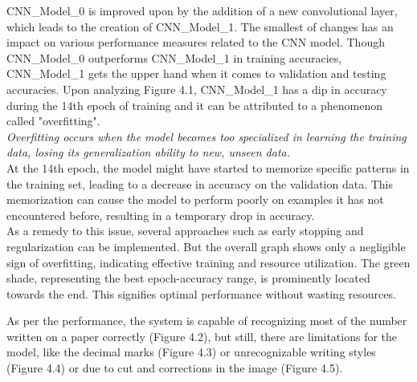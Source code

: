 \noindent CNN\_Model\_0 is improved upon by the addition of a new convolutional layer, which leads to the creation of CNN\_Model\_1. The smallest of changes has an impact on various performance measures related to the CNN model. Though CNN\_Model\_0 outperforms CNN\_Model\_1 in training accuracies, CNN\_Model\_1 gets the upper hand when it comes to validation and testing accuracies. Upon analyzing Figure 4.1, CNN\_Model\_1 has a dip in accuracy during the 14th epoch of training and it can be attributed to a phenomenon called "overfitting".\\

\noindent \textit{Overfitting occurs when the model becomes too specialized in learning the training data, losing its generalization ability to new, unseen data.}\\

\noindent At the 14th epoch, the model might have started to memorize specific patterns in the training set, leading to a decrease in accuracy on the validation data. This memorization can cause the model to perform poorly on examples it has not encountered before, resulting in a temporary drop in accuracy.\\

\noindent As a remedy to this issue, several approaches such as early stopping and regularization can be implemented. But the overall graph shows only a negligible sign of overfitting, indicating effective training and resource utilization. The green shade, representing the best epoch-accuracy range, is prominently located towards the end. This signifies optimal performance without wasting resources.

\clearpage

\noindent
As per the performance, the system is capable of recognizing most of the number written on a paper correctly (Figure 4.2), but still, there are limitations for the model, like the decimal marks (Figure 4.3) or unrecognizable writing styles (Figure 4.4) or due to cut and corrections in the image (Figure 4.5).

\vspace{3mm}

